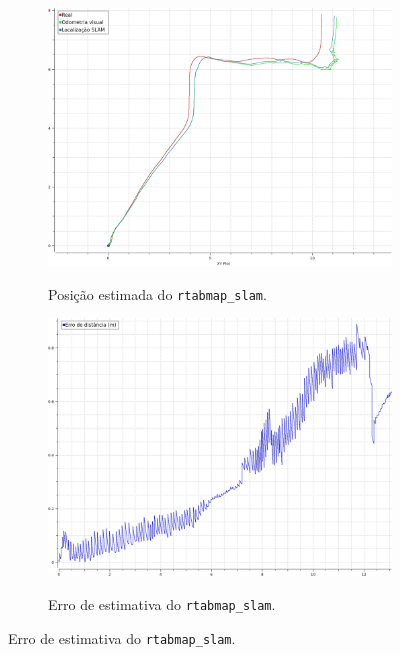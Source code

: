 \documentclass[repeatfields,xlists,xpacks,oneside,yearsonly]{ufrgscca}
\begin{document}
\begin{figure}[h]
    \caption{Resultado do pacote \texttt{rtabmap\_slam}.}
    \label{fig:rtabmap_slam_result}
    \begin{subfigure}{0.5\linewidth}
        {
            \centering
            \caption{Posição estimada do \texttt{rtabmap\_slam}.}
            \label{fig:localization_rtabmap}
            \includegraphics[width=0.98\linewidth]{localization-rtabmap.png}\\
        }
    \end{subfigure}
    \begin{subfigure}{0.5\linewidth}
        {
            \centering
            \caption{Erro de estimativa do \texttt{rtabmap\_slam}.}
            \label{fig:localization_rtabmap_error}
            \includegraphics[width=0.98\linewidth]{localization-rtabmap-error.png}\\
        }
    \end{subfigure}
\end{figure}
\end{document}

